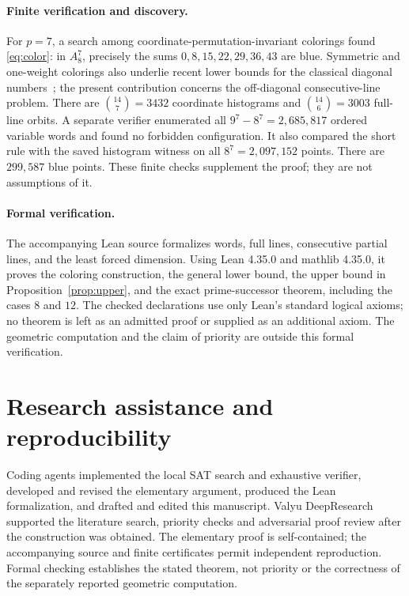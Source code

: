 \documentclass[11pt]{amsart}
\begin{document}
\paragraph{Finite verification and discovery.}
For $p=7$, a search among coordinate-permutation-invariant colorings found \eqref{eq:color}: in $A_8^7$, precisely the sums $0,8,15,22,29,36,43$ are blue. Symmetric and one-weight colorings also underlie recent lower bounds for the classical diagonal numbers~\cite{Mouhib}; the present contribution concerns the off-diagonal consecutive-line problem. There are $\binom{14}{7}=3432$ coordinate histograms and $\binom{14}{6}=3003$ full-line orbits. A separate verifier enumerated all $9^7-8^7=2{,}685{,}817$ ordered variable words and found no forbidden configuration. It also compared the short rule with the saved histogram witness on all $8^7=2{,}097{,}152$ points. There are $299{,}587$ blue points. These finite checks supplement the proof; they are not assumptions of it.

\paragraph{Formal verification.}
The accompanying Lean source formalizes words, full lines, consecutive partial lines, and the least forced dimension. Using Lean 4.35.0 and mathlib 4.35.0, it proves the coloring construction, the general lower bound, the upper bound in Proposition~\ref{prop:upper}, and the exact prime-successor theorem, including the cases $8$ and $12$. The checked declarations use only Lean's standard logical axioms; no theorem is left as an admitted proof or supplied as an additional axiom. The geometric computation and the claim of priority are outside this formal verification.

\ifdefined\journalversion
\section*{Research assistance and reproducibility}
Coding agents implemented the local SAT search and exhaustive verifier, developed and revised the elementary argument, produced the Lean formalization, and drafted and edited this manuscript. Valyu DeepResearch supported the literature search, priority checks and adversarial proof review after the construction was obtained. The elementary proof is self-contained; the accompanying source and finite certificates permit independent reproduction. Formal checking establishes the stated theorem, not priority or the correctness of the separately reported geometric computation.
\fi



\end{document}
